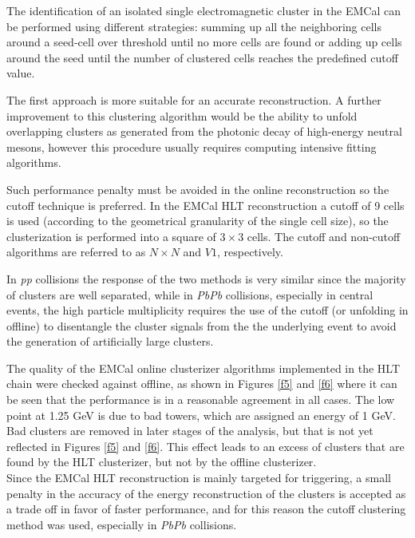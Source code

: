 The identification of an isolated single electromagnetic cluster in the EMCal can be performed using different
strategies: summing up all the neighboring cells around a seed-cell over threshold until no more cells are found 
or adding up cells around the seed until the number of clustered cells reaches the predefined cutoff value.

The first approach is more suitable for an accurate reconstruction. A further improvement to this 
clustering algorithm would be the ability to unfold overlapping clusters as generated from the 
photonic decay of high-energy neutral mesons, however this procedure usually requires computing intensive fitting algorithms. 

Such performance penalty must be avoided in the online reconstruction so the cutoff
technique is preferred.  In the EMCal HLT reconstruction a cutoff of 9 cells is used (according to the 
geometrical granularity of the single cell size), so the clusterization is performed into a 
square of $3\times3$ cells. The cutoff and non-cutoff algorithms are referred to as $N\times N$ and $V1$, respectively.

In {\it pp} collisions the response of the two methods is very similar since the majority of clusters are well separated, while  
in {\it PbPb} collisions, especially in central events, the high particle multiplicity requires the use of the cutoff (or unfolding in offline) 
to disentangle the cluster signals from the the underlying event to avoid the generation of  artificially large clusters.

The quality of the EMCal online clusterizer algorithms implemented in the HLT chain were checked against offline, 
as shown in Figures \ref{f5} and \ref{f6} where it can be seen that the performance is in a reasonable agreement in all cases.
The low point at 1.25 GeV is due to bad towers, which are assigned an energy of 1 GeV.  
Bad clusters are removed in later stages of the analysis, but that is not yet reflected in Figures \ref{f5} and \ref{f6}.  
This effect leads to an excess of clusters that are found by the HLT clusterizer, but not by the offline clusterizer.\\

Since the EMCal HLT reconstruction is mainly targeted for triggering, a small penalty in the accuracy of the energy reconstruction of the clusters is accepted 
as a trade off in favor of faster performance, and for this reason the cutoff clustering method was used, especially in {\it PbPb} collisions.

